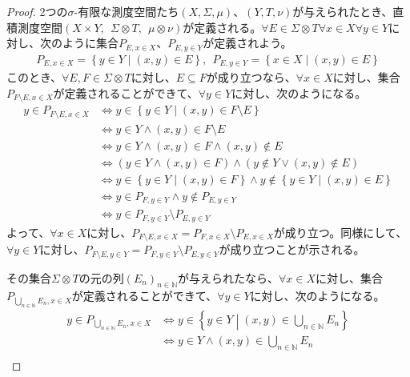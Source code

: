 \documentclass[dvipdfmx]{jsarticle}
\begin{document}
\begin{proof}
2つの$\sigma$-有限な測度空間たち$(X,\varSigma,\mu)$、$(Y,T,\nu)$が与えられたとき、直積測度空間$(X \times Y,\ \ \varSigma \otimes T,\ \ \mu \otimes \nu)$が定義される。$\forall E \in \varSigma \otimes T\forall x \in X\forall y \in Y$に対し、次のように集合$P_{E,x \in X}$、$P_{E,y \in Y}$が定義されよう。
\begin{align*}
P_{E,x \in X} = \left\{ y \in Y \middle| (x,y) \in E \right\},\ \ P_{E,y \in Y} = \left\{ x \in X \middle| (x,y) \in E \right\}
\end{align*}
このとき、$\forall E,F \in \varSigma \otimes T$に対し、$E \subseteq F$が成り立つなら、$\forall x \in X$に対し、集合$P_{F \setminus E,x \in X}$が定義されることができて、$\forall y \in Y$に対し、次のようになる。
\begin{align*}
y \in P_{F \setminus E,x \in X} &\Leftrightarrow y \in \left\{ y \in Y \middle| (x,y) \in F \setminus E \right\}\\
&\Leftrightarrow y \in Y \land (x,y) \in F \setminus E\\
&\Leftrightarrow y \in Y \land (x,y) \in F \land (x,y) \notin E\\
&\Leftrightarrow \left( y \in Y \land (x,y) \in F \right) \land \left( y \notin Y \vee (x,y) \notin E \right)\\
&\Leftrightarrow y \in \left\{ y \in Y \middle| (x,y) \in F \right\} \land y \notin \left\{ y \in Y \middle| (x,y) \in E \right\}\\
&\Leftrightarrow y \in P_{F,y \in Y} \land y \notin P_{E,y \in Y}\\
&\Leftrightarrow y \in P_{F,y \in Y} \setminus P_{E,y \in Y}
\end{align*}
よって、$\forall x \in X$に対し、$P_{F \setminus E,x \in X} = P_{F,x \in X} \setminus P_{E,x \in X}$が成り立つ。同様にして、$\forall y \in Y$に対し、$P_{F \setminus E,y \in Y} = P_{F,y \in Y} \setminus P_{E,y \in Y}$が成り立つことが示される。\par
その集合$\varSigma \otimes T$の元の列$\left( E_{n} \right)_{n \in \mathbb{N}}$が与えられたなら、$\forall x \in X$に対し、集合$P_{\bigcup_{n \in \mathbb{N}} E_{n},x \in X}$が定義されることができて、$\forall y \in Y$に対し、次のようになる。
\begin{align*}
y \in P_{\bigcup_{n \in \mathbb{N}} E_{n},x \in X} &\Leftrightarrow y \in \left\{ y \in Y \middle| (x,y) \in \bigcup_{n \in \mathbb{N}} E_{n} \right\}\\
&\Leftrightarrow y \in Y \land (x,y) \in \bigcup_{n \in \mathbb{N}} E_{n}\\

\end{align*}
\end{proof}
\end{document}
